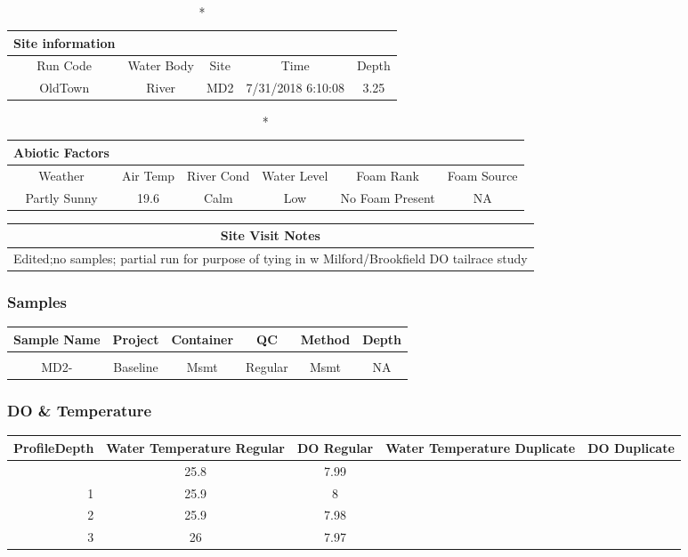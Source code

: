 \documentclass[
  letterpaper,
  DIV=11,
  numbers=noendperiod]{scrartcl}
\begin{document}
\begin{longtable*}{ccccc}
\caption*{
{\large Site information}
} \\ 
\toprule
Run Code & Water Body & Site & Time & Depth \\ 
\midrule\addlinespace[2.5pt]
OldTown & River & MD2 & 7/31/2018 6:10:08 & 3.25 \\ 
\bottomrule
\end{longtable*}

\begin{longtable*}{cccccc}
\caption*{
{\large Abiotic Factors}
} \\ 
\toprule
Weather & Air Temp & River Cond & Water Level & Foam Rank & Foam Source \\ 
\midrule\addlinespace[2.5pt]
Partly Sunny & 19.6 & Calm & Low & No Foam Present & NA \\ 
\bottomrule
\end{longtable*}

\begin{longtable*}{c}
\toprule
Site Visit Notes \\ 
\midrule\addlinespace[2.5pt]
Edited;no samples; partial run for purpose of tying in w Milford/Brookfield DO tailrace study \\ 
\bottomrule
\end{longtable*}

\subsubsection{Samples}

\begin{longtable*}{cccccc}
\toprule
Sample Name & Project & Container & QC & Method & Depth \\ 
\midrule\addlinespace[2.5pt]
 \\ 
\midrule\addlinespace[2.5pt]
MD2- & Baseline & Msmt & Regular & Msmt & NA \\ 
\bottomrule
\end{longtable*}

\subsubsection{DO \& Temperature}

\begin{longtable*}{rcccc}
\toprule
ProfileDepth & Water Temperature Regular & DO Regular & Water Temperature Duplicate & DO Duplicate \\ 
\midrule{} & 25.8 & 7.99 &  &  \\ 
1 & 25.9 & 8 &  &  \\ 
2 & 25.9 & 7.98 &  &  \\ 
3 & 26 & 7.97 &  &  \\ 
\bottomrule
\end{longtable*}
\end{document}
